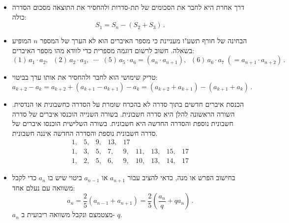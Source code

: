 \begin{itemize}
\item 
דרך אחרת היא לחבר את הסכומים של תת-סדרות ולהחסיר את התוצאה מסכום הסדרה כולה:
\[
S_1 = S_n - (S_2+S_3)\,.
\]
\vspace{-6ex}

\item
הבחינה של חורף תשע"ו מעניינת כי מספר האיברים הוא לא הערך של המספר 
$n$
המופיע בשאלה. חשוב לרשום דוגמה מספרית כדי לוודא מהו מספר האיברים:
\[
(1)\, a_1\cdot a_2,\;\; (2)\,a_2\cdot a_3,\;\;\cdots\;\; (5)\,a_5\cdot a_6=(a_n\cdot a_{n+1}),\;\; (6)\,a_6\cdot a_7 \;(= a_{n+1}\cdot a_{n+2})\,.
\]

\np

\item
טריק שימושי הוא לחבר ולהחסיר את אותו ערך בביטוי:
\[
a_{k+2} - a_{k} = a_{k+2}+(a_{k+1}-a_{k+1})-a_{k} = (a_{k+2}+a_{k+1})-(a_{k+1}+a_{k})\,.
\]
\vspace{-4ex}

\item
הכנסת איברים חדשים בתוך סדרה לא בהכרח שומרת על הסדרה כחשבונית או הנדסית. השורה הראשונה להלן היא סדרה חשבונית. בשורה השנייה הוכנסו איברים של סדרה חשבונית נוספת והסדרה החדשה היא חשבונית. בשורה השלישית הוכנסו איברים של סדרה חשבונית נוספת והסדרה החדשה איננה חשבונית.
\[
\begin{array}{rrrrrrrrrrrrr}
1,& 5,& 9,& 13,& 17\\
1, &3,& 5,&7,& 9,& 11,& 13, &15, & 17\\
1, &2,& 5,&6,& 9,& 10,& 13, &14, & 17
\end{array}
\]
\item
בחישוב הפרש או מנה, כדאי להציב עבור
$a_{n+1}$
או
$a_{n-1}$
ביטוי שיש בו 
$a_n$
כדי לקבל משוואה עם נעלם אחד:
\[
a_n = \frac{2}{5}(a_{n-1}+a_{n+1}) =\frac{2}{5}\left(\frac{a_n}{q}+qa_n\right)\,.
\]
$a_n$
מצטמצם ונקבל משוואה ריבועית ב-%
$q$.

\end{itemize}

